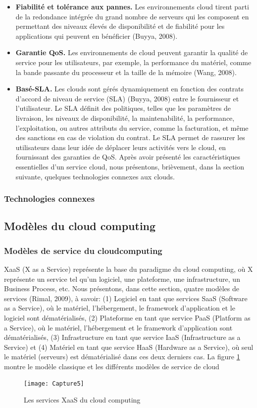 \begin{itemize}
    	\item \textbf{Fiabilité et tolérance aux pannes.} Les environnements cloud tirent parti de la redondance intégrée du grand nombre de serveurs qui les composent en permettant des niveaux élevés de disponibilité et de fiabilité pour les applications qui peuvent en bénéficier (Buyya, 2008). 
    	\item \textbf{Garantie QoS.} Les environnements de cloud peuvent garantir la qualité de service pour les utilisateurs, par exemple, la performance du matériel, comme la bande passante du processeur et la taille de la mémoire (Wang, 2008). 
    	\item \textbf{Basé-SLA.} Les clouds sont gérés dynamiquement en fonction des contrats d’accord de niveau de service (SLA) (Buyya, 2008) entre le fournisseur et l’utilisateur. Le SLA définit des politiques, telles que les paramètres de livraison, les niveaux de disponibilité, la maintenabilité, la performance, l'exploitation, ou autres attributs du service, comme la facturation, et même des sanctions en cas de violation du contrat. Le SLA permet de rassurer les utilisateurs dans leur idée de déplacer leurs activités vers le cloud, en fournissant des garanties de QoS. 
    	Après avoir présenté les caractéristiques essentielles d’un service cloud, nous présentons, brièvement, dans la section suivante, quelques technologies connexes aux clouds.
    	
    \end{itemize} 
\subsubsection{Technologies connexes }

\subsection{Modèles du cloud computing  }
\subsubsection {Modèles de service du cloudcomputing}  
XaaS (X as a Service) représente la base du paradigme du cloud computing, où X représente un service tel qu’un logiciel, une plateforme, une infrastructure, un Business Process, etc. Nous présentons, dans cette section,  quatre  modèles de services (Rimal, 2009), à savoir: (1) Logiciel en tant que services SaaS (Software as a Service), où le matériel, l’hébergement, le framework d’application et le logiciel sont dématérialisés, (2) Plateforme en tant que service PaaS (Platform as a Service), où le matériel, l’hébergement et le framework d’application sont dématérialisés, (3) Infrastructure en tant que service IaaS (Infrastructure as a Service) et (4) Matériel en tant que service HaaS (Hardware as a Service), où seul le matériel (serveurs) est dématérialisé dans ces deux derniers cas. La figure \ref{fig:capture5} montre le modèle classique et les différents modèles de service de cloud
\begin{figure}[h]
	\centering
	\texttt{[image: Capture5]}
	\caption{Les services XaaS du cloud computing}
	\label{fig:capture5}
\end{figure}

